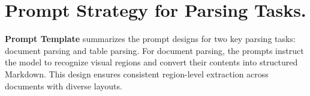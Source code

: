 








\section{Prompt Strategy for Parsing Tasks.}

\textbf{Prompt Template} summarizes the prompt designs for two key parsing tasks: document parsing and table parsing. For document parsing, the prompts instruct the model to recognize visual regions and convert their contents into structured Markdown. This design ensures consistent region-level extraction across documents with diverse layouts.

